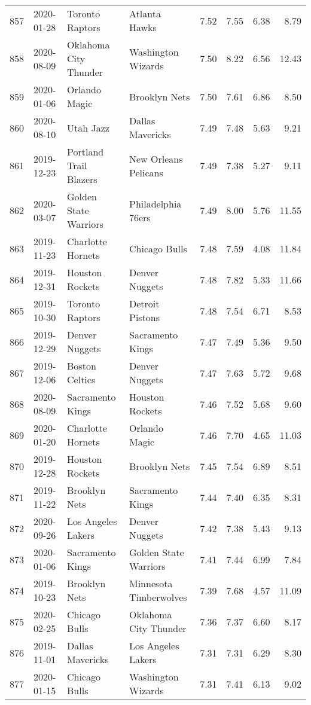 \documentclass[
  11pt,
]{article}
\theoremstyle{nonumberplain}
\begin{document}
\begin{longtable}{rl|llr|rrr}
857 & 2020-01-28 & Toronto Raptors & Atlanta Hawks & 7.52 & 7.55 & 6.38 & 8.79\\
858 & 2020-08-09 & Oklahoma City Thunder & Washington Wizards & 7.50 & 8.22 & 6.56 & 12.43\\
859 & 2020-01-06 & Orlando Magic & Brooklyn Nets & 7.50 & 7.61 & 6.86 & 8.50\\
860 & 2020-08-10 & Utah Jazz & Dallas Mavericks & 7.49 & 7.48 & 5.63 & 9.21\\
861 & 2019-12-23 & Portland Trail Blazers & New Orleans Pelicans & 7.49 & 7.38 & 5.27 & 9.11\\
862 & 2020-03-07 & Golden State Warriors & Philadelphia 76ers & 7.49 & 8.00 & 5.76 & 11.55\\
863 & 2019-11-23 & Charlotte Hornets & Chicago Bulls & 7.48 & 7.59 & 4.08 & 11.84\\
864 & 2019-12-31 & Houston Rockets & Denver Nuggets & 7.48 & 7.82 & 5.33 & 11.66\\
865 & 2019-10-30 & Toronto Raptors & Detroit Pistons & 7.48 & 7.54 & 6.71 & 8.53\\
866 & 2019-12-29 & Denver Nuggets & Sacramento Kings & 7.47 & 7.49 & 5.36 & 9.50\\
867 & 2019-12-06 & Boston Celtics & Denver Nuggets & 7.47 & 7.63 & 5.72 & 9.68\\
868 & 2020-08-09 & Sacramento Kings & Houston Rockets & 7.46 & 7.52 & 5.68 & 9.60\\
869 & 2020-01-20 & Charlotte Hornets & Orlando Magic & 7.46 & 7.70 & 4.65 & 11.03\\
870 & 2019-12-28 & Houston Rockets & Brooklyn Nets & 7.45 & 7.54 & 6.89 & 8.51\\
871 & 2019-11-22 & Brooklyn Nets & Sacramento Kings & 7.44 & 7.40 & 6.35 & 8.31\\
872 & 2020-09-26 & Los Angeles Lakers & Denver Nuggets & 7.42 & 7.38 & 5.43 & 9.13\\
873 & 2020-01-06 & Sacramento Kings & Golden State Warriors & 7.41 & 7.44 & 6.99 & 7.84\\
874 & 2019-10-23 & Brooklyn Nets & Minnesota Timberwolves & 7.39 & 7.68 & 4.57 & 11.09\\
875 & 2020-02-25 & Chicago Bulls & Oklahoma City Thunder & 7.36 & 7.37 & 6.60 & 8.17\\
876 & 2019-11-01 & Dallas Mavericks & Los Angeles Lakers & 7.31 & 7.31 & 6.29 & 8.30\\
877 & 2020-01-15 & Chicago Bulls & Washington Wizards & 7.31 & 7.41 & 6.13 & 9.02\\

\end{longtable}
\end{document}
